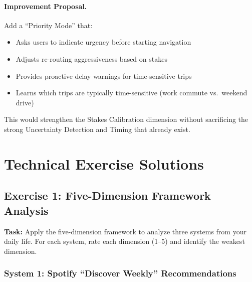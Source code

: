 \paragraph{Improvement Proposal.}

Add a ``Priority Mode'' that:
\begin{itemize}
    \item Asks users to indicate urgency before starting navigation
    \item Adjusts re-routing aggressiveness based on stakes
    \item Provides proactive delay warnings for time-sensitive trips
    \item Learns which trips are typically time-sensitive (work commute vs.\ weekend drive)
\end{itemize}

This would strengthen the Stakes Calibration dimension without sacrificing the strong Uncertainty Detection and Timing that already exist.


\section{Technical Exercise Solutions}
\label{sec:technical-exercise-solutions}

\subsection{Exercise 1: Five-Dimension Framework Analysis}

\textbf{Task:} Apply the five-dimension framework to analyze three systems from your daily life. For each system, rate each dimension (1--5) and identify the weakest dimension.

\subsubsection{System 1: Spotify ``Discover Weekly'' Recommendations}

